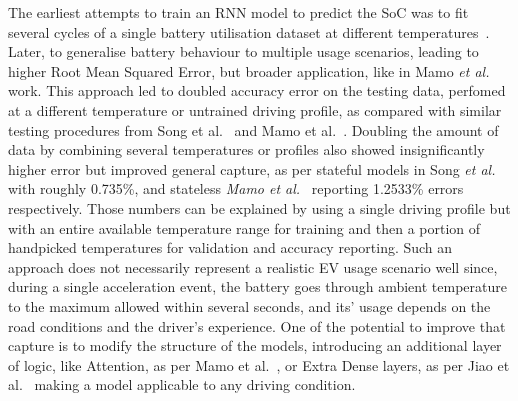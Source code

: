 %
The earliest attempts to train an RNN model to predict the SoC was to fit several cycles of a single battery utilisation dataset at different temperatures~\cite{song_lithium-ion_2018, xiao_accurate_2019,javid_adaptive_2020, jiao_gru-rnn_2020}.
Later, to generalise battery behaviour to multiple usage scenarios, leading to higher Root Mean Squared Error, but broader application, like in Mamo \textit{et al.}~\cite{mamo_long_2020} work.
This approach led to doubled accuracy error on the testing data, perfomed at a different temperature or untrained driving profile, as compared with similar testing procedures from Song et al.~\cite{song_lithium-ion_2018} and Mamo et al.~\cite{mamo_long_2020}.
Doubling the amount of data by combining several temperatures or profiles also showed insignificantly higher error but improved general capture, as per stateful models in Song \textit{et al.}~\cite{song_lithium-ion_2018} with roughly 0.735\%, and stateless \textit{Mamo et al.}~\cite{mamo_long_2020} reporting 1.2533\%  errors respectively.
Those numbers can be explained by using a single driving profile but with an entire available temperature range for training and then a portion of handpicked temperatures for validation and accuracy reporting.
Such an approach does not necessarily represent a realistic EV usage scenario well since, during a single acceleration event, the battery goes through ambient temperature to the maximum allowed within several seconds, and its' usage depends on the road conditions and the driver's experience.
One of the potential to improve that capture is to modify the structure of the models, introducing an additional layer of logic, like Attention, as per Mamo et al.~\cite{mamo_long_2020}, or Extra Dense layers, as per Jiao et al.~\cite{jiao_gru-rnn_2020} making a model applicable to any driving condition.
